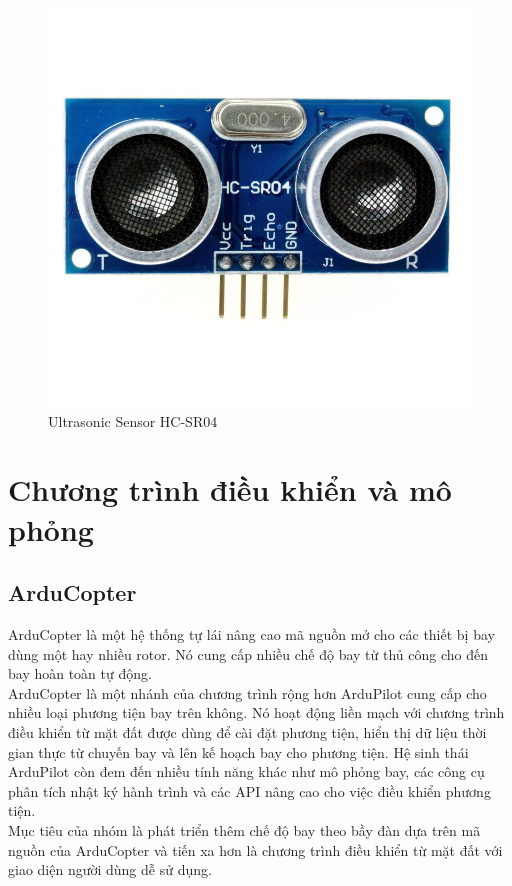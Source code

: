    \begin{figure}[h!]
    	\begin{center}
    		\includegraphics[scale=0.1]{images/ultrasonicsensor.jpg}
    		\caption{Ultrasonic Sensor HC-SR04}
    	\end{center}
    \end{figure}
   
    \section{Chương trình điều khiển và mô phỏng}
            \subsection{ArduCopter}
            ArduCopter là một hệ thống tự lái nâng cao mã nguồn mở cho các thiết bị bay dùng một hay nhiều rotor. Nó cung cấp nhiều chế độ bay từ thủ công cho đến bay hoàn toàn tự động.\\
            ArduCopter là một nhánh của chương trình rộng hơn ArduPilot cung cấp cho nhiều loại phương tiện bay trên không. Nó hoạt động liền mạch với chương trình điều khiển từ mặt đất được dùng để cài đặt phương tiện, hiển thị dữ liệu thời gian thực từ chuyến bay và lên kế hoạch bay cho phương tiện. Hệ sinh thái ArduPilot còn đem đến nhiều tính năng khác như mô phỏng bay, các công cụ phân tích nhật ký hành trình và các API nâng cao cho việc điều khiển phương tiện.\\
            Mục tiêu của nhóm là phát triển thêm chế độ bay theo bầy đàn dựa trên mã nguồn của ArduCopter và tiến xa hơn là chương trình điều khiển từ mặt đất với giao diện người dùng dễ sử dụng.
    
